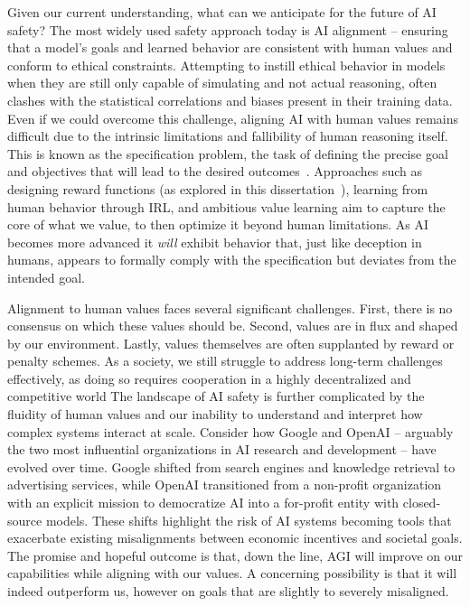 Given our current understanding, what can we anticipate for the future of \gls{AI} safety?
The most widely used safety approach today is \gls{AI} alignment -- ensuring that a model's goals and learned behavior are consistent with human values and conform to ethical constraints.
Attempting to instill ethical behavior in models when they are still only capable of simulating and not actual reasoning, often clashes with the statistical correlations and biases present in their training data.
Even if we could overcome this challenge, aligning \gls{AI} with human values remains difficult due to the intrinsic limitations and fallibility of human reasoning itself.
This is known as the specification problem, the task of defining the precise goal and objectives that will lead to the desired outcomes~\cite{skalse2022defining}.
Approaches such as designing reward functions (as explored in this dissertation~\cite{silver2021reward}), learning from human behavior through \gls{IRL}, and ambitious value learning aim to capture the core of what we value, to then optimize it beyond human limitations.
As AI becomes more advanced it \textit{will} exhibit behavior that, just like deception in humans, appears to formally comply with the specification but deviates from the intended goal.

Alignment to human values faces several significant challenges.
First, there is no consensus on which these values should be.
Second, values are in flux and shaped by our environment.
Lastly, values themselves are often supplanted by reward or penalty schemes.
As a society, we still struggle to address long-term challenges effectively, as doing so requires cooperation in a highly decentralized and competitive world
The landscape of \gls{AI} safety is further complicated by the fluidity of human values and our inability to understand and interpret how complex systems interact at scale.
Consider how Google and OpenAI -- arguably the two most influential organizations in \gls{AI} research and development -- have evolved over time.
Google shifted from search engines and knowledge retrieval to advertising services, while OpenAI transitioned from a non-profit organization with an explicit mission to democratize \gls{AI} into a for-profit entity with closed-source models.
These shifts highlight the risk of AI systems becoming tools that exacerbate existing misalignments between economic incentives and societal goals.
The promise and hopeful outcome is that, down the line, \gls{AGI} will improve on our capabilities while aligning with our values.
A concerning possibility is that it will indeed outperform us, however on goals that are slightly to severely misaligned.


